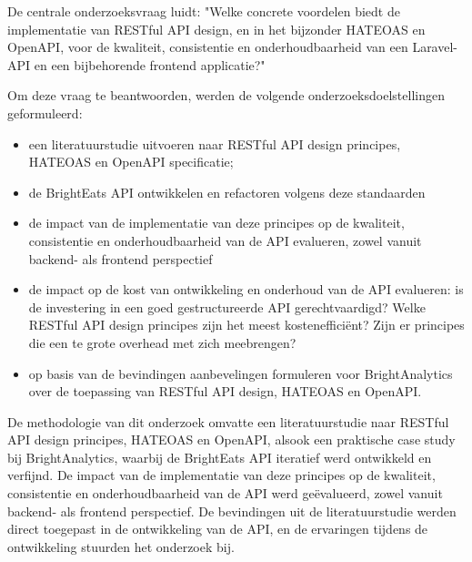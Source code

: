 \bigskip

De centrale onderzoeksvraag luidt: "Welke concrete voordelen biedt de implementatie van RESTful API design, en in het bijzonder HATEOAS en OpenAPI, voor de kwaliteit, consistentie en onderhoudbaarheid van een Laravel-API en een bijbehorende frontend applicatie?"

\bigskip

Om deze vraag te beantwoorden, werden de volgende onderzoeksdoelstellingen geformuleerd:

\begin{itemize}
  \item een literatuurstudie uitvoeren naar RESTful API design principes, HATEOAS en OpenAPI specificatie;
  \item de BrightEats API ontwikkelen en refactoren volgens deze standaarden
  \item de impact van de implementatie van deze principes op de kwaliteit, consistentie en onderhoudbaarheid van de API evalueren, zowel vanuit backend- als frontend perspectief
  \item de impact op de kost van ontwikkeling en onderhoud van de API evalueren: is de investering in een goed gestructureerde API gerechtvaardigd? Welke RESTful API design principes zijn het meest kostenefficiënt? Zijn er principes die een te grote overhead met zich meebrengen?
  \item op basis van de bevindingen aanbevelingen formuleren voor BrightAnalytics over de toepassing van RESTful API design, HATEOAS en OpenAPI.
\end{itemize}

\bigskip

De methodologie van dit onderzoek omvatte een literatuurstudie naar RESTful API design principes, HATEOAS en OpenAPI, alsook een praktische case study bij BrightAnalytics, waarbij de BrightEats API iteratief werd ontwikkeld en verfijnd. De impact van de implementatie van deze principes op de kwaliteit, consistentie en onderhoudbaarheid van de API werd geëvalueerd, zowel vanuit backend- als frontend perspectief. De bevindingen uit de literatuurstudie werden direct toegepast in de ontwikkeling van de API, en de ervaringen tijdens de ontwikkeling stuurden het onderzoek bij.

\bigskip


\bigskip

